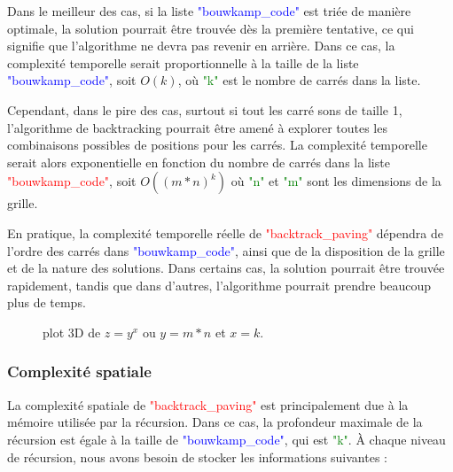\documentclass{article}
\begin{document}
Dans le meilleur des cas, si la liste \textcolor{blue}{"bouwkamp\_code"} est triée de manière optimale, la solution pourrait être trouvée dès la première tentative, ce qui signifie que l'algorithme ne devra pas revenir en arrière. Dans ce cas, la complexité temporelle serait proportionnelle à la taille de la liste \textcolor{blue}{"bouwkamp\_code"}, soit $O(k)$, où \textcolor{green}{"k"} est le nombre de carrés dans la liste.\newline

Cependant, dans le pire des cas, surtout si tout les carré sons de taille 1, l'algorithme de backtracking pourrait être amené à explorer toutes les combinaisons possibles de positions pour les carrés. La complexité temporelle serait alors exponentielle en fonction du nombre de carrés dans la liste \textcolor{red}{"bouwkamp\_code"}, soit $O((m*n)^k)$ où \textcolor{green}{"n"} et \textcolor{green}{"m"} sont les dimensions de la grille.\newline

En pratique, la complexité temporelle réelle de \textcolor{red}{"backtrack\_paving"} dépendra de l'ordre des carrés dans \textcolor{blue}{"bouwkamp\_code"}, ainsi que de la disposition de la grille et de la nature des solutions. Dans certains cas, la solution pourrait être trouvée rapidement, tandis que dans d'autres, l'algorithme pourrait prendre beaucoup plus de temps.

\begin{figure}[htbp]
    \centering
    \caption{plot 3D de $z=y^x$ ou $y=m*n$ et $x=k$.}
    \label{fig4}
\end{figure}


\subsubsection{Complexité spatiale }

La complexité spatiale de \textcolor{red}{"backtrack\_paving"} est principalement due à la mémoire utilisée par la récursion. Dans ce cas, la profondeur maximale de la récursion est égale à la taille de \textcolor{blue}{"bouwkamp\_code"}, qui est \textcolor{green}{"k"}. À chaque niveau de récursion, nous avons besoin de stocker les informations suivantes :\newline
\end{document}
